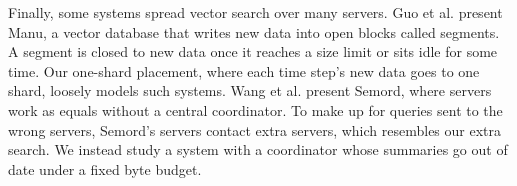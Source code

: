 Finally, some systems spread vector search over many servers.
Guo et al. \cite{guo2022manu} present Manu, a vector database that writes new data into open blocks called segments.
A segment is closed to new data once it reaches a size limit or sits idle for some time.
Our one-shard placement, where each time step's new data goes to one shard, loosely models such systems.
Wang et al. \cite{semord2026} present Semord, where servers work as equals without a central coordinator.
To make up for queries sent to the wrong servers, Semord's servers contact extra servers, which resembles our extra search.
We instead study a system with a coordinator whose summaries go out of date under a fixed byte budget.
